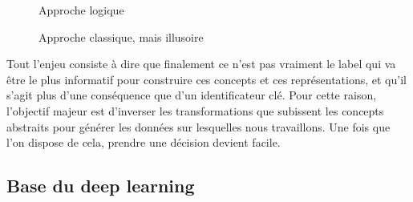 \documentclass[conference]{IEEEtran}
\begin{document}
\begin{figure}[H]
\centering
{}
\caption{Approche logique}
\end{figure}

\begin{figure}[H]
\centering
{}
\caption{Approche classique, mais illusoire}
\label{stuff}
\end{figure}

Tout l'enjeu consiste à dire que finalement ce n'est pas vraiment le label qui va être le plus informatif pour construire ces concepts et ces représentations, et qu'il s'agit plus d'une conséquence que d'un identificateur clé. Pour cette raison, l'objectif majeur est d'inverser les transformations que subissent les concepts abstraits pour générer les données sur lesquelles nous travaillons. Une fois que l'on dispose de cela, prendre une décision devient facile.

\subsection{Base du deep learning}
\end{document}
